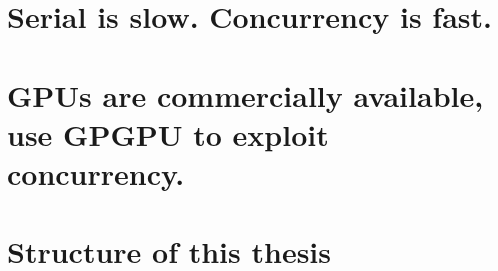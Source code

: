 %
%
\section{Serial is slow. Concurrency is fast.}
%
\section{GPUs are commercially available, use GPGPU to exploit concurrency.}
%
\section{Structure of this thesis}
